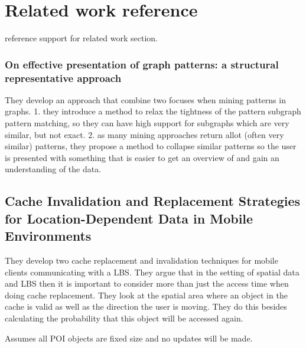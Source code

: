 \section{Related work reference}

reference support for related work section.

\subsubsection{On effective presentation of graph patterns: a structural representative approach}
They develop an approach that combine two focuses when mining patterns in graphs. 1. they introduce a method to relax the tightness of the pattern subgraph pattern matching, so they can have high support for subgraphs which are very similar, but not exact. 2. as many mining approaches return allot (often very similar) patterns, they propose a method to collapse similar patterns so the user is presented with something that is easier to get an overview of and gain an understanding of the data. \cite{napa08}




\subsection{Cache Invalidation and Replacement Strategies for Location-Dependent Data in Mobile Environments}
They develop two cache replacement and invalidation techniques for mobile clients communicating with a LBS. They argue that in the setting of spatial data and LBS then it is important to consider more than just the access time when doing cache replacement. They look at the spatial area where an object in the cache is valid as well as the direction the user is moving. They do this besides calculating the probability that this object will be accessed again.

Assumes all POI objects are fixed size and no updates will be made. \cite{cirslddme}

